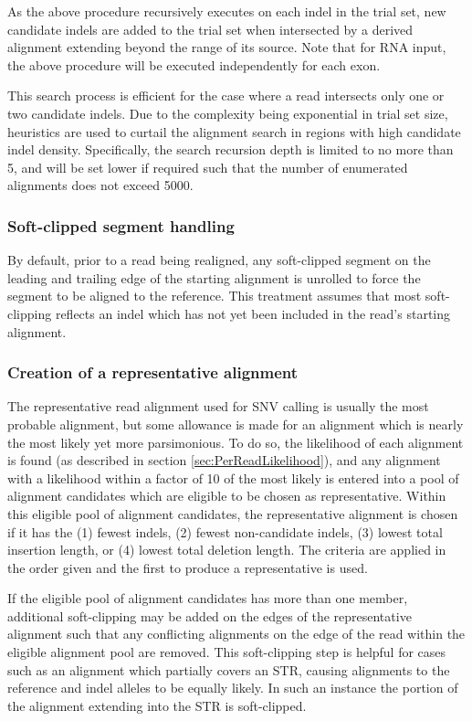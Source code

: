 \documentclass{article}
\begin{document}
As the above procedure recursively executes on each indel in the trial set, new candidate indels are added to the trial set when intersected by a derived alignment extending beyond the range of its source. Note that for RNA input, the above procedure will be executed independently for each exon.

This search process is efficient for the case where a read intersects only one or two candidate indels. Due to the complexity being exponential in trial set size, heuristics are used to curtail the alignment search in regions with high candidate indel density. Specifically, the search recursion depth is limited to no more than 5, and will be set lower if required such that the number of enumerated alignments does not exceed 5000.

\subsubsection{Soft-clipped segment handling}

By default, prior to a read being realigned, any soft-clipped segment on the leading and trailing edge of the starting alignment is unrolled to force the segment to be aligned to the reference. This treatment assumes that most soft-clipping reflects an indel which has not yet been included in the read's starting alignment.

\subsubsection{Creation of a representative alignment}

The representative read alignment used for SNV calling is usually the most probable alignment, but some allowance is made for an alignment which is nearly the most likely yet more parsimonious. To do so, the likelihood of each alignment is found (as described in section \ref{sec:PerReadLikelihood}), and any alignment with a likelihood within a factor of 10 of the most likely is entered into a pool of alignment candidates which are eligible to be chosen as representative. Within this eligible pool of alignment candidates, the representative alignment is chosen if it has the (1) fewest indels, (2) fewest non-candidate indels, (3) lowest total insertion length, or (4) lowest total deletion length. The criteria are applied in the order given and the first to produce a representative is used.

If the eligible pool of alignment candidates has more than one member, additional soft-clipping may be added on the edges of the representative alignment such that any conflicting alignments on the edge of the read within the eligible alignment pool are removed. This soft-clipping step is helpful for cases such as an alignment which partially covers an STR, causing alignments to the reference and indel alleles to be equally likely. In such an instance the portion of the alignment extending into the STR is soft-clipped.
\end{document}
